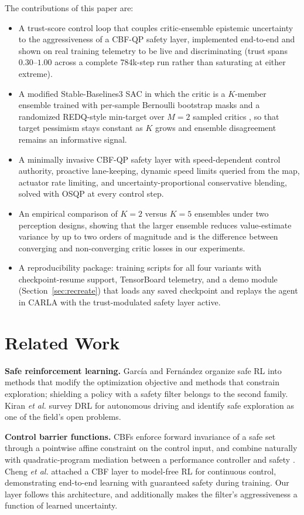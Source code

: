 \documentclass[conference]{IEEEtran}
\begin{document}
The contributions of this paper are:
\begin{itemize}
    \item A trust-score control loop that couples critic-ensemble epistemic uncertainty to the aggressiveness of a CBF-QP safety layer, implemented end-to-end and shown on real training telemetry to be live and discriminating (trust spans $0.30$--$1.00$ across a complete 784k-step run rather than saturating at either extreme).
    \item A modified Stable-Baselines3 SAC in which the critic is a $K$-member ensemble trained with per-sample Bernoulli bootstrap masks and a randomized REDQ-style min-target over $M{=}2$ sampled critics \cite{chen2021redq}, so that target pessimism stays constant as $K$ grows and ensemble disagreement remains an informative signal.
    \item A minimally invasive CBF-QP safety layer with speed-dependent control authority, proactive lane-keeping, dynamic speed limits queried from the map, actuator rate limiting, and uncertainty-proportional conservative blending, solved with OSQP \cite{stellato2020osqp} at every control step.
    \item An empirical comparison of $K{=}2$ versus $K{=}5$ ensembles under two perception designs, showing that the larger ensemble reduces value-estimate variance by up to two orders of magnitude and is the difference between converging and non-converging critic losses in our experiments.
    \item A reproducibility package: training scripts for all four variants with checkpoint-resume support, TensorBoard telemetry, and a demo module (Section~\ref{sec:recreate}) that loads any saved checkpoint and replays the agent in CARLA with the trust-modulated safety layer active.
\end{itemize}

\section{Related Work}
\textbf{Safe reinforcement learning.} Garc\'ia and Fern\'andez \cite{garcia2015survey} organize safe RL into methods that modify the optimization objective and methods that constrain exploration; shielding a policy with a safety filter belongs to the second family. Kiran \emph{et al.} \cite{kiran2022survey} survey DRL for autonomous driving and identify safe exploration as one of the field's open problems.

\textbf{Control barrier functions.} CBFs enforce forward invariance of a safe set through a pointwise affine constraint on the control input, and combine naturally with quadratic-program mediation between a performance controller and safety \cite{ames2017cbf, ames2019cbf}. Cheng \emph{et al.} \cite{cheng2019endtoend} attached a CBF layer to model-free RL for continuous control, demonstrating end-to-end learning with guaranteed safety during training. Our layer follows this architecture, and additionally makes the filter's aggressiveness a function of learned uncertainty.
\end{document}
